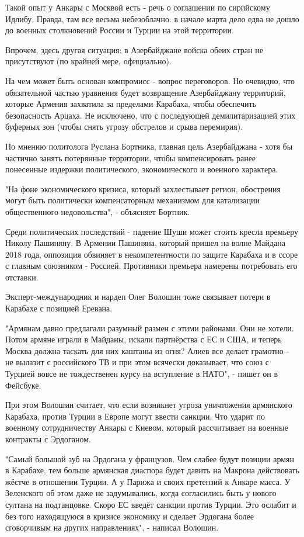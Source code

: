 Такой опыт у Анкары с Москвой есть - речь о соглашении по сирийскому Идлибу.
Правда, там все весьма небезоблачно: в начале марта дело едва не дошло до
военных столкновений России и Турции на этой территории. 

Впрочем, здесь другая ситуация: в Азербайджане войска обеих стран не
присутствуют (по крайней мере, официально). 

На чем может быть основан компромисс - вопрос переговоров. Но очевидно, что
обязательной частью уравнения будет возвращение Азербайджану территорий,
которые Армения захватила за пределами Карабаха, чтобы обеспечить безопасность
Арцаха. Не исключено, что с последующей демилитаризацией этих буферных зон
(чтобы снять угрозу обстрелов и срыва перемирия). 

По мнению политолога Руслана Бортника, главная цель Азербайджана - хотя бы
частично занять потерянные территории, чтобы компенсировать ранее понесенные
издержки политического, экономического и военного характера.  

"На фоне экономического кризиса, который захлестывает регион, обострения могут
быть политически компенсаторным механизмом для катализации общественного
недовольства", - объясняет Бортник.

Среди политических последствий - падение Шуши может стоить кресла премьеру
Николу Пашиняну. В Армении Пашиняна, который пришел на волне Майдана 2018 года,
оппозиция обвиняет в некомпетентности по защите Карабаха и в ссоре с главным
союзником - Россией. Противники премьера намерены потребовать его отставки.

Эксперт-международник и нардеп Олег Волошин тоже связывает потери в Карабахе с
позицией Еревана. 

"Армянам давно предлагали разумный размен с этими районами. Они не хотели.
Потом армяне играли в Майданы, искали партнёрства с ЕС и США, и теперь Москва
должна таскать для них каштаны из огня? Алиев все делает грамотно - не вылазит
с российского ТВ и при этом всячески доказывает, что союз с Турцией вовсе не
тождественен курсу на вступление в НАТО", - пишет он в Фейсбуке. 

При этом Волошин считает, что если возникнет угроза уничтожения армянского
Карабаха, против Турции в Европе могут ввести санкции. Что ударит по военному
сотрудничеству Анкары с Киевом, который рассчитывает на военные контракты с
Эрдоганом. 

"Самый большой зуб на Эрдогана у французов. Чем слабее будут позиции армян в
Карабахе, тем больше армянская диаспора будет давить на Макрона действовать
жёстче в отношении Турции. А у Парижа и своих претензий к Анкаре масса. У
Зеленского об этом даже не задумывались, когда согласились быть у нового
султана на подтанцовке. Скоро ЕС введёт санкции против Турции. Это ослабит и
без того находящуюся в кризисе экономику и сделает Эрдогана более сговорчивым
на других направлениях", - написал Волошин.

